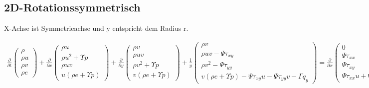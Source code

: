\subsection{2D-Rotationssymmetrisch}
X-Achse ist Symmetrieachse und y entspricht dem Radius r.

\begin{align*}
\frac{\partial}{\partial t}
\begin{pmatrix}
\rho
\\
\rho u
\\
\rho v
\\
\rho e
\end{pmatrix}
+
\frac{\partial}{\partial x}
\begin{pmatrix}
\rho u
\\
\rho u^2 + \Upsilon p
\\
\rho uv
\\
u\left(\rho e+\Upsilon p\right)
\end{pmatrix}
+
\frac{\partial}{\partial y}
\begin{pmatrix}
\rho v
\\
\rho uv
\\
\rho v^2 + \Upsilon p
\\
v\left(\rho e+\Upsilon p\right)
\end{pmatrix}
+
\frac{1}{y}
\begin{pmatrix}
\rho v
\\
\rho uv - \Psi \tau_{xy}
\\
\rho v^2 - \Psi \tau_{yy}
\\
v\left(\rho e+\Upsilon p\right) - \Psi \tau_{xy} u - \Psi \tau_{yy} v - \Gamma q_y
\end{pmatrix}
=
\frac{\partial}{\partial x}
\begin{pmatrix}
0
\\
\Psi \tau_{xx}
\\
\Psi \tau_{xy}
\\
\Psi \tau_{xx}u+\Psi \tau_{xy}v+\Gamma q_x
\end{pmatrix}
+\frac{\partial}{\partial y}
\begin{pmatrix}
0
\\
\Psi \tau_{yx}
\\
\Psi \tau_{yy}
\\
\Psi \tau_{yx}u+\Psi \tau_{yy}v+\Gamma q_y
\end{pmatrix}
\end{align*}

